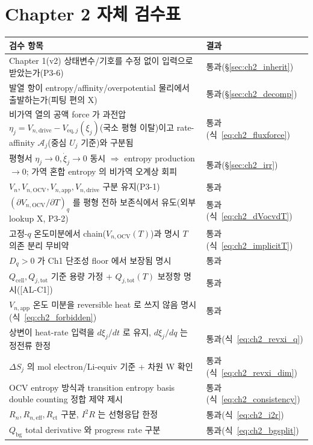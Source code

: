\documentclass[11pt,a4paper]{article}
\newcommand{\eff}{\mathrm{eff}}
\newcommand{\eq}{\mathrm{eq}}
\newcommand{\app}{\mathrm{app}}
\newcommand{\drive}{\mathrm{drive}}
\newcommand{\tot}{\mathrm{tot}}
\newcommand{\bg}{\mathrm{bg}}
\newcommand{\cell}{\mathrm{cell}}
\newcommand{\OCV}{\mathrm{OCV}}
\newcommand{\AL}[1]{\textsf{[AL-#1]}}
\begin{document}
\section{Chapter 2 자체 검수표}\label{sec:ch2_selfcheck}
{\small
\begin{longtable}{p{} p{}}
\toprule 검수 항목 & 결과 \\ \midrule \endhead
Chapter 1(v2) 상태변수/기호를 수정 없이 입력으로 받았는가(P3-6) & 통과(\S\ref{sec:ch2_inherit}) \\
발열 항이 entropy/affinity/overpotential 물리에서 출발하는가(피팅 편의 X) & 통과(\S\ref{sec:ch2_decomp}) \\
비가역 열의 공액 force 가 과전압 $\eta_j=V_{n,\drive}-V_{\eq,j}(\xi_j)$(국소 평형 이탈)이고 rate-affinity $\mathcal A_j$(중심 $U_j$ 기준)와 구분됨 & 통과(식~\eqref{eq:ch2_fluxforce}) \\
평형서 $\eta_j\to0,\dot\xi_j\to0$ 동시 $\Rightarrow$ entropy production$\to0$; 가역 혼합 entropy 의 비가역 오계상 회피 & 통과(\S\ref{sec:ch2_irr}) \\
$V_n,V_{n,\OCV},V_{n,\app},V_{n,\drive}$ 구분 유지(P3-1) & 통과 \\
$(\partial V_{n,\OCV}/\partial T)_q$ 를 평형 전하 보존식에서 유도(외부 lookup X, P3-2) & 통과(식~\eqref{eq:ch2_dVocvdT}) \\
고정-$q$ 온도미분에서 chain($V_{n,\OCV}(T)$)과 명시 $T$ 의존 분리 무비약 & 통과(식~\eqref{eq:ch2_implicitT}) \\
$D_q>0$ 가 Ch1 단조성 floor 에서 보장됨 명시 & 통과 \\
$Q_\cell,Q_{j,\tot}$ 기준 용량 가정 + $Q_{j,\tot}(T)$ 보정항 명시(\AL{C1}) & 통과 \\
$V_{n,\app}$ 온도 미분을 reversible heat 로 쓰지 않음 명시(식~\eqref{eq:ch2_forbidden}) & 통과 \\
상변이 heat-rate 입력을 $d\xi_j/dt$ 로 유지, $d\xi_j/dq$ 는 정전류 한정 & 통과(식~\eqref{eq:ch2_revxi_q}) \\
$\Delta S_j$ 의 mol electron/Li-equiv 기준 + 차원 W 확인 & 통과(식~\eqref{eq:ch2_revxi_dim}) \\
OCV entropy 방식과 transition entropy basis double counting 정합 제약 제시 & 통과(식~\eqref{eq:ch2_consistency}) \\
$R_n,R_{n,\eff},R_{\mathrm{ct}}$ 구분, $I^2R$ 는 선형응답 한정 & 통과(식~\eqref{eq:ch2_i2r}) \\
$Q_\bg$ total derivative 와 progress rate 구분 & 통과(식~\eqref{eq:ch2_bgsplit}) \\

\end{longtable}}
\end{document}
